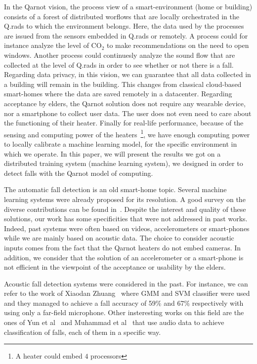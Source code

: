 \documentclass[10pt, conference, compsocconf]{IEEEtran}
\begin{document}
In the Qarnot vision, the process view of a smart-environment (home or building) consists of a forest of distributed 
worflows that are locally orchestrated in the Q.rads to which the environment belongs. Here, the data used by the processes are 
issued from the sensors embedded in Q.rads or remotely. A process could for instance analyze the level of $\mathrm{CO_2}$ to make 
recommendations on the need to open windows. Another process could continuesly analyze the sound flow that are collected 
at the level of Q.rads in order to see whether or not there is a fall. 
Regarding data privacy, in this vision, we can guarantee that all data collected in a building will remain in the building. 
This changes from classical cloud-based smart-homes where the data are saved remotely in a datacenter. 
Regarding acceptance by elders, the Qarnot solution does not require any wearable device, nor a smartphone to collect user data. 
The user does not even need to care about the functioning of their heater. Finally for real-life performance, because of the sensing and 
computing power of the heaters~\footnote{ A heater could embed $4$ processors}, we have enough computing power to locally 
calibrate a machine learning model, for the specific environment in which we operate.
In this paper, we will present the results we got on a distributed training system (machine learning system), 
we designed in order to detect falls with the Qarnot model of computing. 

The automatic fall detection is an old smart-home topic. Several machine learning systems were already 
proposed for its resolution. A good survey on the diverse contributions can be found in~\cite{Igual2013,Mubashir:2013:SFD:2397722.2397898}. 
Despite the interest and quality of these solutions, our work has some specificities that were not addressed in past 
works. Indeed, past systems were often based on videos, accelerometers or smart-phones while we are mainly based on 
acoustic data. The choice to consider acoustic inputs comes from the fact that the Qarnot heaters do not embed cameras. In addition, 
we consider that the solution of an accelerometer or a smart-phone is not efficient in the viewpoint of the acceptance or 
usability by the elders. 

Acoustic fall detection systems were considered in the past. For instance, we can refer to the work of Xiaodan Zhuang~\cite{Xiaodan2009} where GMM and SVM classifier were used and they managed to achieve a fall accuracy of 59\% and 67\% respectively with using only a far-field microphone. Other insteresting works on this field are the ones of Yun et al~\cite{Yun2012} and Muhammad et al~\cite{Muhammad2014} that use audio data to achieve classification of falls, each of them in a specific way.  
\end{document}
